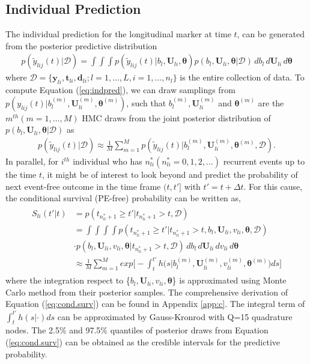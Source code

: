 \subsection{Individual Prediction}

The individual prediction for the longitudinal marker at time $t$, can be generated from the posterior predictive distribution 
\begin{align} \label{eq:indpred}    
    p(\tilde{y}_{lij}(t)|\mathcal{D})=\int\int\int p(\tilde{y}_{lij}(t)|b_l,\bm{U}_{li},\bm{\theta}) p(b_l,\bm{U}_{li},\bm{\theta}|\mathcal{D}) \,  db_l \,  d\bm{U}_{li} \, d\bm{\theta} 
\end{align}
where $\mathcal{D}=\{\bm{y}_{li},\bm{t}_{li},\bm{d}_{li}; l=1,\dots,L, i=1,\dots,n_l\}$ is the entire collection of data. To compute Equation (\ref{eq:indpred}), we can draw samplings from $p(y_{lij}(t)|b_l^{(m)},\bm{U}_{li}^{(m)},\bm{\theta}^{(m)})$, such that ${b_l^{(m)}, \bm{U}_{li}^{(m)}}$ and $\bm{\theta}^{(m)}$ are the $m^{th}(m=1,\dots,M)$ HMC draws from the joint posterior distribution of $p(b_l,\bm{U}_{li},\bm{\theta}|\mathcal{D})$ as 
\begin{align} \label{eq:indpred2}
  p(\tilde{y}_{lij}(t)|\mathcal{D}) \approx \frac{1}{M} \sum_{m=1}^{M} p(\tilde{y}_{lij}(t)|b_l^{(m)},\bm{U}_{li}^{(m)},\bm{\theta}^{(m)},\mathcal{D}).   
\end{align}
In parallel, for $i^{th}$ individual who has $n^*_{li}(n^*_{li}=0,1,2,\dots)$ recurrent events up to the time $t$, it might be of interest to look beyond and predict the probability of next event-free outcome in the time frame $(t,t']$ with $t'=t+\Delta t$. For this cause, the conditional survival (PE-free) probability can be written as,
\begin{align} \label{eq:cond.surv}
    \begin{split}
        S_{li}(t'|t) & = p(t_{n^*_{li}+1} \geq t'|t_{n^*_{li}+1} > t, \mathcal{D})  \\
                    & = \int\int\int\int p(t_{n^*_{li}+1} \geq t'|t_{n^*_{li}+1} > t, b_l,\bm{U}_{li},v_{li},\bm{\theta},\mathcal{D}) \\
                    & \cdot p(b_l, \bm{U}_{li}, v_{li}, \bm{\theta} |t_{n^*_{li}+1} > t, \mathcal{D}) \, db_l \, d\bm{U}_{li} \, dv_{li} \, d\bm{\theta} \\
        & \approx \frac{1}{M} \sum_{m=1}^{M} exp\Big[ -\int_t^{t'} h\big(s|b_l^{(m)},\bm{U}_{li}^{(m)},v_{li}^{(m)},\bm{\theta}^{(m)}\big) ds \Big]
    \end{split}
\end{align}
where the integration respect to \{$b_l,\bm{U}_{li}, v_{li}, \bm{\theta}$\} is approximated using Monte Carlo method from their posterior samples. The comprehensive derivation of Equation (\ref{eq:cond.surv}) can be found in Appendix \ref{app:c}. The integral term of $\int_{t}^{t'}h(s|\cdot)ds$ can be approximated by Gauss-Kronrod with Q=15 quadrature nodes. The 2.5\% and 97.5\% quantiles of posterior draws from Equation (\ref{eq:cond.surv}) can be obtained as the credible intervals for the predictive probability. 

